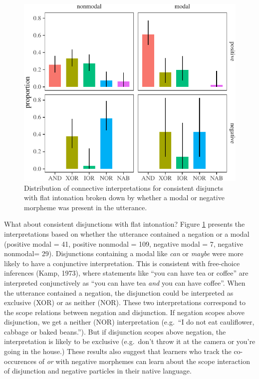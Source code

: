 \documentclass[
  ,man,floatsintext]{apa6}
\begin{document}
\begin{figure}[H]

{\centering \includegraphics{figs/negModalPlot-1} 

}

\caption{Distribution of connective interpretations for consistent disjuncts with flat intonation broken down by whether a modal or negative morpheme was present in the utterance.}\label{fig:negModalPlot}
\end{figure}

What about consistent disjunctions with flat intonation? Figure \ref{fig:negModalPlot} presents the interpretations based on whether the utterance contained a negation or a modal (positive modal = 41, positive nonmodal = 109, negative modal = 7, negative nonmodal= 29). Disjunctions containing a modal like \emph{can} or \emph{maybe} were more likely to have a conjunctive interpretation. This is consistent with free-choice inferences (Kamp, 1973), where statements like ``you can have tea or coffee'' are interpreted conjunctively as ``you can have tea \emph{and} you can have coffee''. When the utterance contained a negation, the disjunction could be interpreted as exclusive (XOR) or as neither (NOR). These two interpretations correspond to the scope relations between negation and disjunction. If negation scopes above disjunction, we get a neither (NOR) interpretation (e.g.~``I do not eat cauliflower, cabbage or baked beans.''). But if disjunction scopes above negation, the interpretation is likely to be exclusive (e.g.~don't throw it at the camera or you're going in the house.) These results also suggest that learners who track the co-occurences of \emph{or} with negative morphemes can learn about the scope interaction of disjunction and negative particles in their native language.
\end{document}
